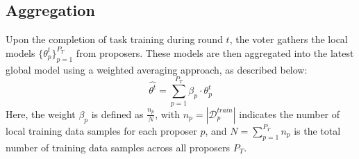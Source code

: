 \documentclass[conference]{IEEEtran}
\newcommand{\rui}[1]{{\color{black} #1}}
\begin{document}




\subsection{\FL Aggregation}

\rui{Upon the completion of task training during round $t$, the voter gathers the local models $\{\theta_p^{t}\}_{p=1}^{P_T}$ from proposers. These models are then aggregated into the latest global model using a weighted averaging approach, as described below:
\begin{equation*}
\hat{\theta^t} = \sum_{p=1}^{P_T} \beta_p \cdot \theta_p^{t}
\label{eq:WeightedAvg}
\end{equation*}
Here, the weight $\beta_p$ is defined as $\frac{n_p}{N}$, with $n_p = |\mathcal{D}_p^{train}|$ indicates the number of local training data samples for each proposer $p$, and $N = \sum_{p=1}^{P_T} n_p$ is the total number of training data samples across all proposers $P_T$. 
}



        
        
        
\end{document}
